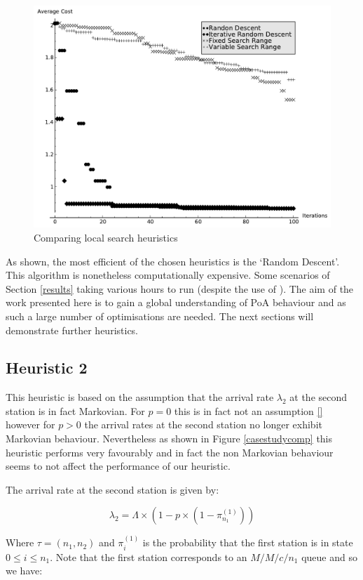 \documentclass[12pt]{article}
\begin{document}
\begin{figure}[!hbtp]
    \begin{center}
        \includegraphics[width=.6\textwidth]{Images/Solver_Comp.pdf}
    \end{center}
    \caption{Comparing local search heuristics}\label{basicsearch}
\end{figure}

As shown, the most efficient of the chosen heuristics is the `Random Descent'.
This algorithm is nonetheless computationally expensive.
Some scenarios of Section \ref{results} taking various hours to run (despite the use of \cite{web002}).
The aim of the work presented here is to gain a global understanding of PoA behaviour and as such a large number of optimisations are needed.
The next sections will demonstrate further heuristics.

\subsection{Heuristic 2}\label{heuristic2}

This heuristic is based on the assumption that the arrival rate $\lambda_2$ at the second station is in fact Markovian.
For $p=0$ this is in fact not an assumption \ref{} however for $p>0$ the arrival rates at the second station no longer exhibit Markovian behaviour.
Nevertheless as shown in Figure \ref{casestudycomp} this heuristic performs very favourably and in fact the non Markovian behaviour seems to not affect the performance of our heuristic.

The arrival rate at the second station is given by:

\begin{equation}
\lambda_2 = \Lambda\times(1-p\times(1-\pi^{(1)}_{n_1}))
\end{equation}

Where $\tau=(n_1, n_2)$ and $\pi^{(1)}_{i}$ is the probability that the first station is in state $0\leq i\leq n_1$.
Note that the first station corresponds to an $M/M/c/n_1$ queue and so we have:
\end{document}
